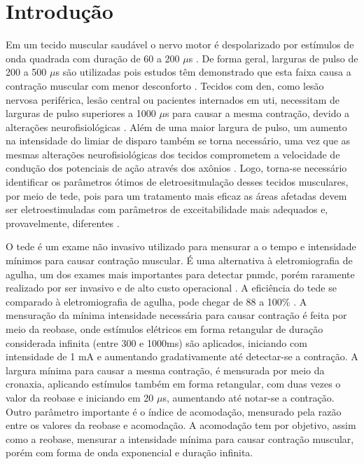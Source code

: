 \section{Introdução}

Em um tecido muscular saudável o nervo motor é despolarizado por estímulos de onda quadrada com duração de 60 a 200 $\mu$s . De forma geral, larguras de pulso de 200 a 500 $\mu$s são utilizadas pois estudos têm demonstrado que esta faixa causa a contração muscular com menor desconforto . Tecidos com \ac{den}, como lesão nervosa periférica, lesão central ou pacientes internados em \ac{uti}, necessitam de larguras de pulso superiores a 1000 $\mu$s para causar a mesma contração, devido a alterações neurofisiológicas . Além de uma maior largura de pulso, um aumento na intensidade do limiar de disparo também se torna necessário, uma vez que as mesmas alterações neurofisiológicas dos tecidos comprometem a velocidade de condução dos potenciais de ação através dos axônios . Logo, torna-se necessário identificar os parâmetros ótimos de eletroesitmulação desses tecidos musculares, por meio de \ac{tede}, pois para um tratamento mais eficaz as áreas afetadas devem ser eletroestimuladas com parâmetros de exceitabilidade mais adequados e, provavelmente, diferentes .

O \ac{tede} é um exame não invasivo utilizado para mensurar a o tempo e intensidade mínimos para causar contração muscular. É uma alternativa à eletromiografia de agulha, um dos exames mais importantes para detectar \ac{pnmdc}, porém raramente realizado por ser invasivo e de alto custo operacional \cite{schuhfried2005}. A eficiência do \ac{tede} se comparado à eletromiografia de agulha, pode chegar de 88 a 100\% \cite{schuhfried2005}. A mensuração da mínima intensidade necessária para causar contração é feita por meio da reobase, onde estímulos elétricos em forma retangular de duração considerada infinita (entre 300 e 1000ms) são aplicados, iniciando com intensidade de 1 mA e aumentando gradativamente até detectar-se a contração. A largura mínima para causar a mesma contração, é mensurada por meio da cronaxia, aplicando estímulos também em forma retangular, com duas vezes o valor da reobase e iniciando em 20 $\mu$s, aumentando até notar-se a contração. Outro parâmetro importante é o índice de acomodação, mensurado pela razão entre os valores da reobase e acomodação. A acomodação tem por objetivo, assim como a reobase, mensurar a intensidade mínima para causar contração muscular, porém com forma de onda exponencial e duração infinita.

